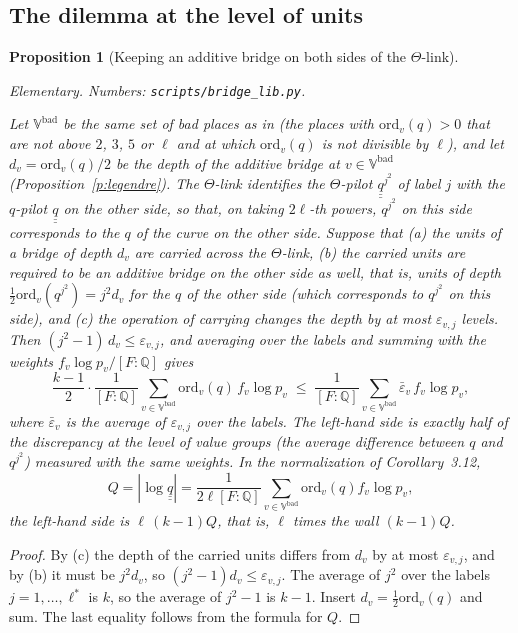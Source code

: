 \documentclass[11pt,a4paper]{article}
\numberwithin{table}{section}
\newcommand{\Q}{\mathbb{Q}}
\newcommand{\Vbad}{\mathbb{V}^{\mathrm{bad}}}
\newcommand{\qq}{\underline{\underline{q}}}
\newcommand{\lab}[2]{{\upshape\fcolorbox{#1}{#1!8}{\scriptsize\sffamily\bfseries\textcolor{#1}{#2}}}}
\newcommand{\tagP}{\lab{ForestGreen}{P}}
\newcommand{\known}[1]{\par{\footnotesize\itshape #1}\par}
\theoremstyle{plain}
\newtheorem{proposition}{Proposition}[section]
\theoremstyle{definition}
\begin{document}
\subsection{The dilemma at the level of units}
\begin{proposition}[Keeping an additive bridge on both sides of the $\Theta$-link]\label{p:gap}
\tagP{}\known{Elementary. Numbers: \texttt{scripts/bridge\_lib.py}.}
Let $\Vbad$ be the same set of bad places as in \cite{TC} (the places with $\mathrm{ord}_v(q)>0$ that are not above $2$,
$3$, $5$ or $\ell$ and at which $\mathrm{ord}_v(q)$ is not divisible by $\ell$), and let $d_v=\mathrm{ord}_v(q)/2$ be
the depth of the additive bridge at $v\in\Vbad$ (Proposition~\ref{p:legendre}). The $\Theta$-link identifies the
$\Theta$-pilot $\qq^{j^2}$ of label $j$ with the $q$-pilot $\qq$ on the other side, so that, on taking $2\ell$-th
powers, $q^{j^2}$ on this side corresponds to the $q$ of the curve on the other side. Suppose that (a) the units of a
bridge of depth $d_v$ are carried across the $\Theta$-link, (b) the carried units are required to be an additive bridge
on the other side as well, that is, units of depth $\frac12\mathrm{ord}_v(q^{j^2})=j^2d_v$ for the $q$ of the other side
(which corresponds to $q^{j^2}$ on this side), and (c) the operation of carrying changes the depth by at most
$\varepsilon_{v,j}$ levels. Then $(j^2-1)\,d_v\le\varepsilon_{v,j}$, and averaging over the labels and summing with the
weights $f_v\log p_v/[F:\Q]$ gives
\[\frac{k-1}{2}\cdot\frac{1}{[F:\Q]}\sum_{v\in\Vbad}\mathrm{ord}_v(q)\,f_v\log p_v
\;\le\;\frac{1}{[F:\Q]}\sum_{v\in\Vbad}\bar\varepsilon_v\,f_v\log p_v,\]
where $\bar\varepsilon_v$ is the average of $\varepsilon_{v,j}$ over the labels. The left-hand side is exactly half of
the discrepancy at the level of value groups (the average difference between $q$ and $q^{j^2}$) measured with the same
weights. In the normalization of Corollary~3.12,
\[Q=|\log\qq|=\frac{1}{2\ell[F:\Q]}\sum_{v\in\Vbad}\mathrm{ord}_v(q)f_v\log p_v,\]
the left-hand side is $\ell\,(k-1)Q$, that is, $\ell$ times the wall $(k-1)Q$.
\end{proposition}
\begin{proof}
By (c) the depth of the carried units differs from $d_v$ by at most $\varepsilon_{v,j}$, and by (b) it must be
$j^2d_v$, so $(j^2-1)d_v\le\varepsilon_{v,j}$. The average of $j^2$ over the labels $j=1,\dots,\ell^*$ is $k$, so the
average of $j^2-1$ is $k-1$. Insert $d_v=\frac12\mathrm{ord}_v(q)$ and sum. The last equality follows from the formula
for $Q$.
\end{proof}
\end{document}
